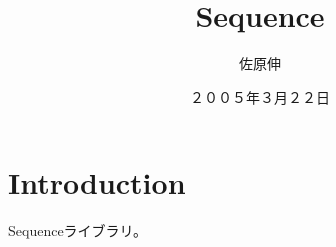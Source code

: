 \documentclass[\pformat,12pt]{jarticle}
\title{Sequence}
\author{佐原伸}
\date{２００５年３月２２日}
\begin{document}
\maketitle

\section{Introduction}

Sequenceライブラリ。




\newpage
{}
\printindex
\end{document}
